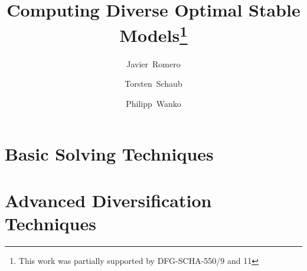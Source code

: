 \documentclass[a4paper,USenglish]{oasics-v2016}
\title{Computing Diverse Optimal Stable Models\footnote{This work was partially supported by DFG-SCHA-550/9 and 11}}
\author[1]{Javier~Romero}
\author[1,2]{Torsten~Schaub}
\author[1]{Philipp~Wanko}
\affil[1]{University of Potsdam, Germany}
\affil[2]{INRIA Rennes, France}
\begin{document}
\maketitle
%

%



\section{Basic Solving Techniques}\label{sec:basic}




\section{Advanced Diversification Techniques}\label{sec:advanced}


%


\end{document}
